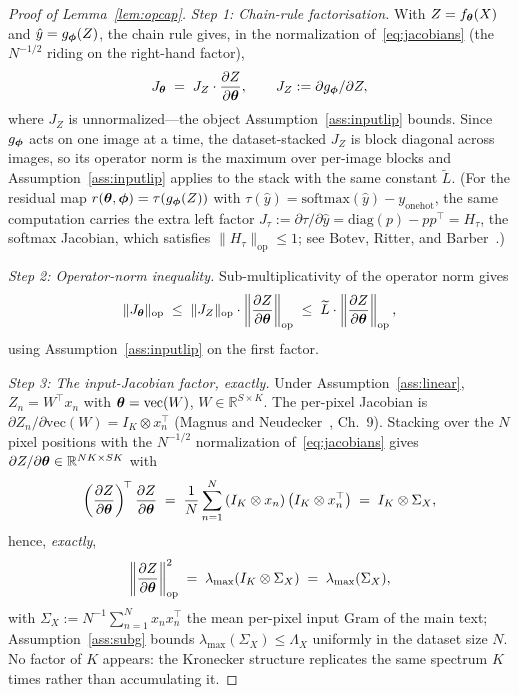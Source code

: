 \begin{proof}[Proof of Lemma~\ref{lem:opcap}]
\emph{Step 1: Chain-rule factorisation.}
With $Z = f_{\boldsymbol{\theta}}(X)$ and $\hat{y} = g_{\boldsymbol{\phi}}(Z)$, the chain rule gives, in
the normalization of~\eqref{eq:jacobians} (the $N^{-1/2}$ riding on the
right-hand factor),
\[
    J_{\boldsymbol{\theta}}
    \;=\; J_Z \cdot \frac{\partial Z}{\partial {\boldsymbol{\theta}}},
    \qquad J_Z := \partial g_{\boldsymbol{\phi}} / \partial Z ,
\]
where $J_Z$ is unnormalized---the object Assumption~\ref{ass:inputlip}
bounds. Since $g_{\boldsymbol{\phi}}$ acts on one image at a time, the dataset-stacked
$J_Z$ is block diagonal across images, so its operator norm is the maximum
over per-image blocks and Assumption~\ref{ass:inputlip} applies to the stack
with the same constant $\widetilde{L}$. (For the residual map
$r({\boldsymbol{\theta}},{\boldsymbol{\phi}}) = \tau(g_{\boldsymbol{\phi}}(Z))$ with $\tau(\hat{y}) =
\mathrm{softmax}(\hat{y}) - y_{\mathrm{onehot}}$, the same computation
carries the extra left factor $J_\tau := \partial \tau / \partial \hat{y} =
\mathrm{diag}(p) - p p^\top = H_\tau$, the softmax Jacobian, which satisfies
$\|H_\tau\|_{\mathrm{op}} \leq 1$; see Botev, Ritter, and
Barber~\citep{botev2017practical}.)

\emph{Step 2: Operator-norm inequality.}
Sub-multiplicativity of the operator norm gives
\[
    \|J_{\boldsymbol{\theta}}\|_{\mathrm{op}}
    \;\leq\; \|J_Z\|_{\mathrm{op}}
             \cdot \left\| \frac{\partial Z}{\partial {\boldsymbol{\theta}}}
             \right\|_{\mathrm{op}}
    \;\leq\; \widetilde{L} \cdot
             \left\| \frac{\partial Z}{\partial {\boldsymbol{\theta}}}
             \right\|_{\mathrm{op}},
\]
using Assumption~\ref{ass:inputlip} on the first factor.

\emph{Step 3: The input-Jacobian factor, exactly.}
Under Assumption~\ref{ass:linear}, $Z_n = W^\top x_n$ with
${\boldsymbol{\theta}} = \mathrm{vec}(W)$, $W \in \mathbb{R}^{S \times K}$. The per-pixel
Jacobian is $\partial Z_n / \partial \mathrm{vec}(W) = I_K \otimes x_n^\top$
(Magnus and Neudecker~\citep{magnus1988matrix}, Ch.~9). Stacking over the
$N$ pixel positions with the $N^{-1/2}$ normalization
of~\eqref{eq:jacobians} gives
$\partial Z / \partial {\boldsymbol{\theta}} \in \mathbb{R}^{NK \times SK}$ with
\[
    \left( \frac{\partial Z}{\partial {\boldsymbol{\theta}}} \right)^{\!\top}
    \frac{\partial Z}{\partial {\boldsymbol{\theta}}}
    \;=\; \frac{1}{N}\sum_{n=1}^{N} \left( I_K \otimes x_n \right)
          \left( I_K \otimes x_n^\top \right)
    \;=\; I_K \otimes \Sigma_X ,
\]
hence, \emph{exactly},
\[
    \left\| \frac{\partial Z}{\partial {\boldsymbol{\theta}}} \right\|_{\mathrm{op}}^{2}
    \;=\; \lambda_{\max}(I_K \otimes \Sigma_X)
    \;=\; \lambda_{\max}(\Sigma_X),
\]
with $\Sigma_X := N^{-1}\sum_{n=1}^{N} x_n x_n^\top$ the mean per-pixel input
Gram of the main text;
Assumption~\ref{ass:subg} bounds $\lambda_{\max}(\Sigma_X) \leq \Lambda_X$
uniformly in the dataset size $N$. No factor of $K$ appears: the Kronecker
structure replicates the same spectrum $K$ times rather than accumulating
it.


\end{proof}

